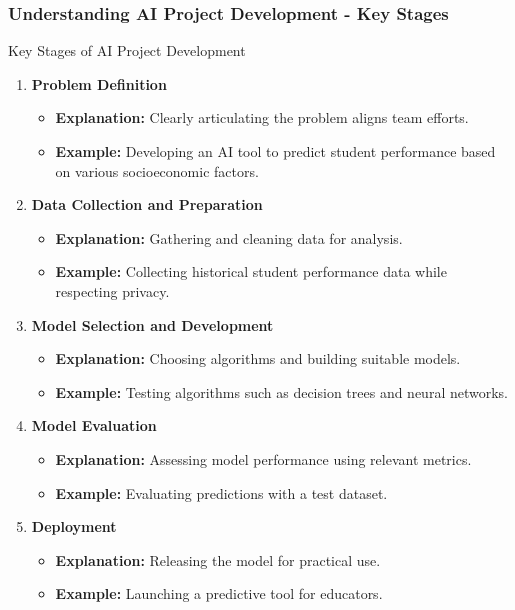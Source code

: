 \documentclass{beamer}
\begin{document}
\begin{frame}[fragile]
    \frametitle{Understanding AI Project Development - Key Stages}
    \begin{block}{Key Stages of AI Project Development}
        \begin{enumerate}
            \item \textbf{Problem Definition}
            \begin{itemize}
                \item \textbf{Explanation:} Clearly articulating the problem aligns team efforts. 
                \item \textbf{Example:} Developing an AI tool to predict student performance based on various socioeconomic factors.
            \end{itemize}
            
            \item \textbf{Data Collection and Preparation}
            \begin{itemize}
                \item \textbf{Explanation:} Gathering and cleaning data for analysis.
                \item \textbf{Example:} Collecting historical student performance data while respecting privacy.
            \end{itemize}

            \item \textbf{Model Selection and Development}
            \begin{itemize}
                \item \textbf{Explanation:} Choosing algorithms and building suitable models.
                \item \textbf{Example:} Testing algorithms such as decision trees and neural networks.
            \end{itemize}

            \item \textbf{Model Evaluation}
            \begin{itemize}
                \item \textbf{Explanation:} Assessing model performance using relevant metrics.
                \item \textbf{Example:} Evaluating predictions with a test dataset.
            \end{itemize}

            \item \textbf{Deployment}
            \begin{itemize}
                \item \textbf{Explanation:} Releasing the model for practical use.
                \item \textbf{Example:} Launching a predictive tool for educators.
            \end{itemize}


\end{enumerate}
\end{block}
\end{frame}
\end{document}
